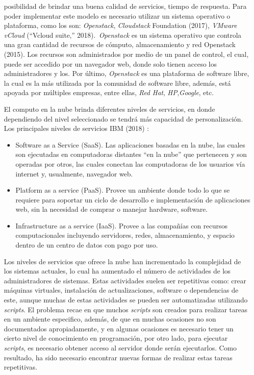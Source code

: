 \documentclass[12pt,twoside]{reedthesis}
\theoremstyle{definition}
\theoremstyle{definition}
\theoremstyle{definition}
\theoremstyle{remark}
\begin{document}
posibilidad de brindar una buena calidad de servicios, tiempo de
respuesta. Para poder implementar este modelo es necesario utilizar un
sistema operativo o plataforma, como los son: \emph{Openstack},
\emph{Cloudstack} Foundation (2017), \emph{VMware vCloud} (``Vcloud
suite,'' 2018).~\emph{Openstack} es un sistema operativo que controla
una gran cantidad de recursos de cómputo, almacenamiento y red Openstack
(2015). Los recursos son administrados por medio de un panel de control,
el cual, puede ser accedido por un navegador web, donde solo tienen
acceso los administradores y los. Por último, \emph{Openstack} es una
plataforma de software libre, la cual es la más utilizada por la
comunidad de software libre, además, está apoyada por múltiples
empresas, entre ellas, \emph{Red Hat}, \emph{HP},\emph{Google}, etc.~

El computo en la nube brinda diferentes niveles de servicios, en donde
dependiendo del nivel seleccionado se tendrá más capacidad de
personalización. Los principales niveles de servicios IBM (2018) :
\begin{itemize}
\item
  Software as a Service (SaaS). Las aplicaciones basadas en la nube, las
  cuales son ejecutadas en computadoras distantes ``en la nube'' que
  pertenecen y son operadas por otros, las cuales conectan las
  computadoras de los usuarios vía internet y, usualmente, navegador
  web.
\item
  Platform as a service (PaaS). Provee un ambiente donde todo lo que se
  requiere para soportar un ciclo de desarrollo e implementación de
  aplicaciones web, sin la necesidad de comprar o manejar hardware,
  software.
\item
  Infrastructure as a service (IaaS). Provee a las compañías con
  recursos computacionales incluyendo servidores, redes, almacenamiento,
  y espacio dentro de un centro de datos con pago por uso.
\end{itemize}
Los niveles de servicios que ofrece la nube han incrementado la
complejidad de los sistemas actuales, lo cual ha aumentado el número de
actividades de los administradores de sistemas. Estas actividades suelen
ser repetitivas como: crear máquinas virtuales, instalación de
actualizaciones, software o dependencias de este, aunque muchas de estas
actividades se pueden ser automatizadas utilizando \emph{scripts}. El
problema recae en que muchos \emph{scripts} son creados para realizar
tareas en un ambiente especifico, además, de que en muchas ocasiones no
son documentados apropiadamente, y en algunas ocasiones es necesario
tener un cierto nivel de conocimiento en programación, por otro lado,
para ejecutar \emph{scripts}, es necesario obtener acceso al servidor
donde serán ejecutarlos. Como resultado, ha sido necesario encontrar
nuevas formas de realizar estas tareas repetitivas.
\end{document}
